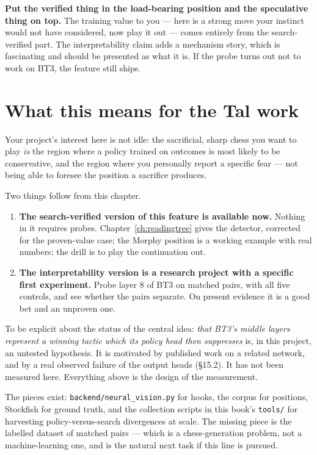 \begin{keyidea}
\textbf{Put the verified thing in the load-bearing position and the speculative thing on
top.} The training value to you --- here is a strong move your instinct would not have
considered, now play it out --- comes entirely from the search-verified part. The
interpretability claim adds a mechanism story, which is fascinating and should be presented as
what it is. If the probe turns out not to work on BT3, the feature still ships.
\end{keyidea}

\section{What this means for the Tal work}

Your project's interest here is not idle: the sacrificial, sharp chess you want to play
\emph{is} the region where a policy trained on outcomes is most likely to be conservative, and
the region where you personally report a specific fear --- not being able to foresee the
position a sacrifice produces.

Two things follow from this chapter.

\begin{enumerate}
\item \textbf{The search-verified version of this feature is available now.} Nothing in it
  requires probes. Chapter~\ref{ch:readingtree} gives the detector, corrected for the
  proven-value case; the Morphy position is a working example with real numbers; the drill is
  to play the continuation out.
\item \textbf{The interpretability version is a research project with a specific first
  experiment.} Probe layer 8 of BT3 on matched pairs, with all five controls, and see whether
  the pairs separate. On present evidence it is a good bet and an unproven one.
\end{enumerate}

\begin{hypothesis}
To be explicit about the status of the central idea: \emph{that BT3's middle layers represent
a winning tactic which its policy head then suppresses} is, in this project, an untested
hypothesis. It is motivated by published work on a related network, and by a real observed
failure of the output heads (§15.2). It has not been measured here. Everything above is the
design of the measurement.
\end{hypothesis}

\begin{repobox}[title={in this repository}]
The pieces exist: \texttt{backend/neural\_vision.py} for hooks, the corpus for positions,
Stockfish for ground truth, and the collection scripts in this book's \texttt{tools/} for
harvesting policy-versus-search divergences at scale. The missing piece is the labelled
dataset of matched pairs --- which is a chess-generation problem, not a machine-learning one,
and is the natural next task if this line is pursued.
\end{repobox}

